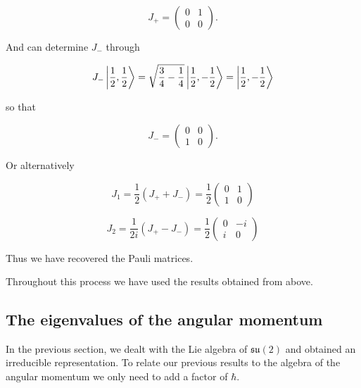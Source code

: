 \documentclass[12pt, a4paper]{article}
\begin{document}
\begin{example}
\begin{itemize}
\[ J_+ = \begin{pmatrix} 0 & 1 \\ 0 & 0 \end{pmatrix}. \]

And can determine \( J_- \) through

\[ J_-\ket{\frac{1}{2}, \frac{1}{2}} = \sqrt{\frac{3}{4} - \frac{1}{4}} \ket{\frac{1}{2}, -\frac{1}{2}} = \ket{\frac{1}{2}, -\frac{1}{2}} \]

so that

\[ J_- = \begin{pmatrix} 0 & 0 \\ 1 & 0 \end{pmatrix}. \]

Or alternatively

\[ J_1 = \frac{1}{2}(J_+ + J_-) = \frac{1}{2} \begin{pmatrix} 0 & 1 \\ 1 & 0 \end{pmatrix} \]

\[ J_2 = \frac{1}{2i}(J_+ - J_-) = \frac{1}{2} \begin{pmatrix} 0 & -i \\ i & 0 \end{pmatrix} \]

Thus we have recovered the Pauli matrices.
    \end{itemize}
\end{example}

\begin{mdnote}
    Throughout this process we have used the results obtained from above.
\end{mdnote}

\subsection{The eigenvalues of the angular momentum}

\begin{mdnote}
    In the previous section, we dealt with the Lie algebra of \(\mathfrak{su}(2)\) and obtained an irreducible representation. To relate our previous results to the algebra of the angular momentum we only need to add a factor of \(\hbar\). 
\end{mdnote}
\end{document}
